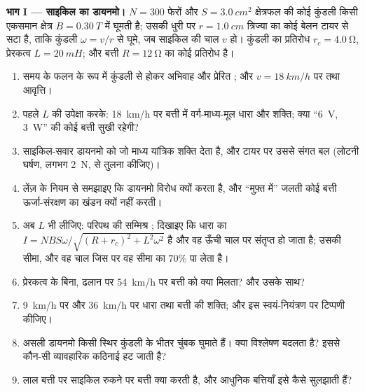 \begin{problem}
\medskip
\noindent\textbf{भाग I --- साइकिल का डायनमो।}
$N = 300$ फेरों और $S = \qty{3.0}{cm^2}$ क्षेत्रफल की कोई कुंडली किसी
एकसमान क्षेत्र $B = \qty{0.30}{T}$ में घूमती है; उसकी धुरी पर
$r = \qty{1.0}{cm}$ त्रिज्या का कोई बेलन टायर से सटा है, ताकि कुंडली
$\omega = v/r$ से घूमे, जब साइकिल की चाल $v$ हो। कुंडली का प्रतिरोध $r_c = \qty{4.0}{\ohm}$,
प्रेरकत्व $L = \qty{20}{mH}$; और बत्ती $R = \qty{12}{\ohm}$ का कोई प्रतिरोध है।
\begin{enumerate}
  \item समय के फलन के रूप में कुंडली से होकर अभिवाह और प्रेरित ; और $v = \qty{18}{km/h}$ पर  तथा आवृत्ति।
  \item पहले $L$ की उपेक्षा करके: \qty{18}{km/h} पर बत्ती में
        वर्ग-माध्य-मूल धारा और शक्ति; क्या ``\qty{6}{V}, \qty{3}{W}'' की
        कोई बत्ती सुखी रहेगी?
  \item साइकिल-सवार डायनमो को जो माध्य यांत्रिक शक्ति देता है, और टायर पर
        उससे संगत बल (लोटनी घर्षण, लगभग \qty{2}{N}, से तुलना कीजिए)।
  \item लेंज़ के नियम से समझाइए कि डायनमो विरोध क्यों करता है, और ``मुफ़्त
        में'' जलती कोई बत्ती ऊर्जा-संरक्षण का खंडन क्यों नहीं करती।
  \item अब $L$ भी लीजिए: परिपथ की सम्मिश्र ; दिखाइए कि धारा का
         $I = NBS\omega/\sqrt{(R + r_c)^2 + L^2\omega^2}$ है और वह ऊँची चाल
        पर संतृप्त हो जाता है; उसकी सीमा, और वह चाल जिस पर वह सीमा का
        $70\%$ पा लेता है।
  \item प्रेरकत्व के बिना, ढलान पर \qty{54}{km/h} पर बत्ती को क्या मिलता?
        और उसके साथ?
  \item \qty{9}{km/h} पर और \qty{36}{km/h} पर धारा तथा बत्ती की शक्ति; और
        इस स्वयं-नियंत्रण पर टिप्पणी कीजिए।
  \item असली डायनमो किसी स्थिर कुंडली के भीतर चुंबक घुमाते हैं। क्या
        विश्लेषण बदलता है? इससे कौन-सी व्यावहारिक कठिनाई हट जाती है?
  \item लाल बत्ती पर साइकिल रुकने पर बत्ती क्या करती है, और आधुनिक
        बत्तियाँ इसे कैसे सुलझाती हैं?
\end{enumerate}


\end{problem}
